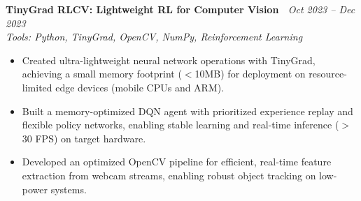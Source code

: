\documentclass[a4paper,10pt]{article}
\newcommand{\resumeItemListStart}{\begin{itemize}[leftmargin=*,labelsep=1mm,itemsep=0.5mm]}
\newcommand{\resumeSubHeadingListEnd}{\end{itemize}\vspace{2mm}}
\newcommand{\resumeItemListEnd}{\end{itemize}\vspace{-2mm}}
\newcommand{\resumeheading}[4]{%
  \item[] \textbf{#1} \hfill \textit{\footnotesize{#4}} \\%
  \textit{\footnotesize{#3}} \\%
  \vspace{-2mm}%
}
\begin{document}
\resumeheading
  {TinyGrad RLCV: Lightweight RL for Computer Vision~%
    \href{https://github.com/ch33nchan/rlcv}{\textcolor{darkblue}{\faGithub}}
  }
  {}
  {Tools: Python, TinyGrad, OpenCV, NumPy, Reinforcement Learning}
  {Oct 2023 -- Dec 2023}

\vspace{0.5mm}

\resumeItemListStart
  \item Created ultra-lightweight neural network operations with TinyGrad, achieving a small memory footprint ($<$10MB) for deployment on resource-limited edge devices (mobile CPUs and ARM).
  \item Built a memory-optimized DQN agent with prioritized experience replay and flexible policy networks, enabling stable learning and real-time inference ($>$30 FPS) on target hardware.
  \item Developed an optimized OpenCV pipeline for efficient, real-time feature extraction from webcam streams, enabling robust object tracking on low-power systems.
\resumeItemListEnd

\vspace{2.5mm}

\begin{comment}
\resumeheading
  {SAC: Soft Actor-Critic Robot Navigation~%
    \href{https://github.com/ch33nchan/isaac-sim}{\textcolor{darkblue}{\faGithub}}
  }
  {}
  {Tools: Python, PyTorch, Isaac Sim, ROS2, OpenCV}
  {Jul 2024 -- Aug 2024}

\vspace{0.5mm}

\resumeItemListStart
  \item Built a reinforcement learning system for autonomous robot navigation using Soft Actor-Critic algorithm with entropy regularization for continuous control in Isaac Sim environment.
  \item Implemented experience replay buffer system to store and sample past robot experiences for off-policy learning and improved sample efficiency during training.
  \item Created dynamic obstacle avoidance environment with 9x9 grid layout, random cube placement, and LIDAR-based state representation for robust navigation policy learning.
  \item Integrated ROS2 bridge for real-time communication between Isaac Sim and control systems, enabling seamless robot control and sensor data processing.
\resumeItemListEnd

\resumeSubHeadingListEnd

\end{comment}
\end{document}
